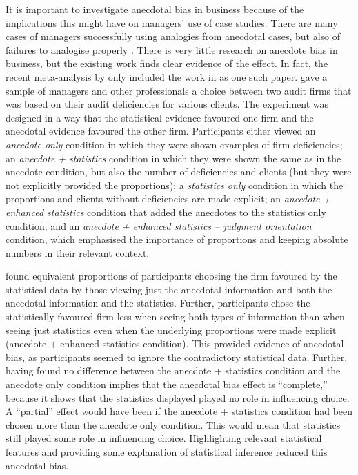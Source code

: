 \documentclass[a4paper, nobind, dvipsnames]{templates/ociamthesis}
\theoremstyle{definition}
\theoremstyle{definition}
\theoremstyle{definition}
\theoremstyle{definition}
\theoremstyle{remark}
\begin{document}
It is important to investigate anecdotal bias in business because of the
implications this might have on managers' use of case studies. There are many
cases of managers successfully using analogies from anecdotal cases, but also of
failures to analogise properly \autocite{gavetti2005,gavetti2005a}. There is very
little research on anecdote bias in business, but the existing work finds clear
evidence of the effect. In fact, the recent meta-analysis by \textcite{freling2020} only
included the work in \textcite{wainberg2013} as one such paper. \textcite{wainberg2013} gave a
sample of managers and other professionals a choice between two audit firms that
was based on their audit deficiencies for various clients. The experiment was
designed in a way that the statistical evidence favoured one firm and the
anecdotal evidence favoured the other firm. Participants either viewed an
\emph{anecdote only} condition in which they were shown examples of firm
deficiencies; an \emph{anecdote + statistics} condition in which they were shown the
same as in the anecdote condition, but also the number of deficiencies and
clients (but they were not explicitly provided the proportions); a \emph{statistics
only} condition in which the proportions and clients without deficiencies are
made explicit; an \emph{anecdote + enhanced statistics} condition that added the
anecdotes to the statistics only condition; and an \emph{anecdote + enhanced
statistics -- judgment orientation} condition, which emphasised the importance of
proportions and keeping absolute numbers in their relevant context.

\textcite{wainberg2013} found equivalent proportions of participants choosing the firm
favoured by the statistical data by those viewing just the anecdotal information
and both the anecdotal information and the statistics. Further, participants
chose the statistically favoured firm less when seeing both types of information
than when seeing just statistics even when the underlying proportions were made
explicit (anecdote + enhanced statistics condition). This provided evidence of
anecdotal bias, as participants seemed to ignore the contradictory statistical
data. Further, having found no difference between the anecdote + statistics
condition and the anecdote only condition implies that the anecdotal bias effect
is ``complete,'' because it shows that the statistics displayed played no role in
influencing choice. A ``partial'' effect would have been if the anecdote +
statistics condition had been chosen more than the anecdote only condition. This
would mean that statistics still played some role in influencing choice.
Highlighting relevant statistical features and providing some explanation of
statistical inference reduced this anecdotal bias.
\end{document}
